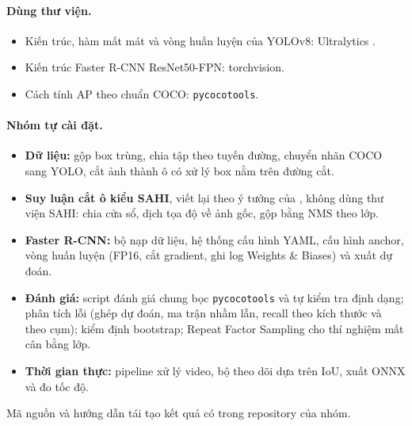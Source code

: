 \paragraph{Dùng thư viện.}
\begin{itemize}
\item Kiến trúc, hàm mất mát và vòng huấn luyện của YOLOv8: Ultralytics \citep{jocher2023ultralytics}.
\item Kiến trúc Faster R-CNN ResNet50-FPN: torchvision.
\item Cách tính AP theo chuẩn COCO: \texttt{pycocotools}.
\end{itemize}

\paragraph{Nhóm tự cài đặt.}
\begin{itemize}
\item \textbf{Dữ liệu:} gộp box trùng, chia tập theo tuyến đường, chuyển nhãn COCO sang YOLO, cắt ảnh thành ô có xử lý box nằm trên đường cắt.
\item \textbf{Suy luận cắt ô kiểu SAHI}, viết lại theo ý tưởng của \citet{akyon2022sahi}, không dùng thư viện SAHI: chia cửa sổ, dịch tọa độ về ảnh gốc, gộp bằng NMS theo lớp.
\item \textbf{Faster R-CNN:} bộ nạp dữ liệu, hệ thống cấu hình YAML, cấu hình anchor, vòng huấn luyện (FP16, cắt gradient, ghi log Weights \& Biases) và xuất dự đoán.
\item \textbf{Đánh giá:} script đánh giá chung bọc \texttt{pycocotools} và tự kiểm tra định dạng; phân tích lỗi (ghép dự đoán, ma trận nhầm lẫn, recall theo kích thước và theo cụm); kiểm định bootstrap; Repeat Factor Sampling cho thí nghiệm mất cân bằng lớp.
\item \textbf{Thời gian thực:} pipeline xử lý video, bộ theo dõi dựa trên IoU, xuất ONNX và đo tốc độ.
\end{itemize}
Mã nguồn và hướng dẫn tái tạo kết quả có trong repository của nhóm.
